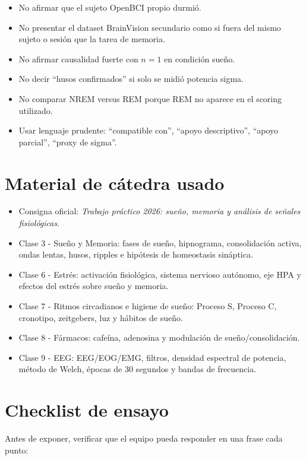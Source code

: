 \documentclass[11pt,a4paper]{article}
\begin{document}
\begin{itemize}
\item No afirmar que el sujeto OpenBCI propio durmió.
\item No presentar el dataset BrainVision secundario como si fuera del mismo sujeto o sesión que la tarea de memoria.
\item No afirmar causalidad fuerte con $n=1$ en condición sueño.
\item No decir ``husos confirmados'' si solo se midió potencia sigma.
\item No comparar NREM versus REM porque REM no aparece en el scoring utilizado.
\item Usar lenguaje prudente: ``compatible con'', ``apoyo descriptivo'', ``apoyo parcial'', ``proxy de sigma''.
\end{itemize}

\section{Material de cátedra usado}

\begin{itemize}
\item Consigna oficial: \textit{Trabajo práctico 2026: sueño, memoria y análisis de señales fisiológicas}.
\item Clase 3 - Sueño y Memoria: fases de sueño, hipnograma, consolidación activa, ondas lentas, husos, ripples e hipótesis de homeostasis sináptica.
\item Clase 6 - Estrés: activación fisiológica, sistema nervioso autónomo, eje HPA y efectos del estrés sobre sueño y memoria.
\item Clase 7 - Ritmos circadianos e higiene de sueño: Proceso S, Proceso C, cronotipo, zeitgebers, luz y hábitos de sueño.
\item Clase 8 - Fármacos: cafeína, adenosina y modulación de sueño/consolidación.
\item Clase 9 - EEG: EEG/EOG/EMG, filtros, densidad espectral de potencia, método de Welch, épocas de 30 segundos y bandas de frecuencia.
\end{itemize}


\section{Checklist de ensayo}

Antes de exponer, verificar que el equipo pueda responder en una frase cada punto:
\end{document}
